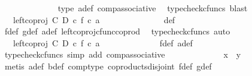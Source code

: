 \begin{isabellebody}
\ \ \ \ \ \ \ \ \ \ \ \ \isamarkupfalse%
\ {\isasymphi}{\isacharunderscore}{\kern0pt}type\ a{\isacharprime}{\kern0pt}{\isacharunderscore}{\kern0pt}def\ comp{\isacharunderscore}{\kern0pt}associative{}\ \isamarkupfalse%
\ {\isacharparenleft}{\kern0pt}typecheck{\isacharunderscore}{\kern0pt}cfuncs{\isacharcomma}{\kern0pt}\ blast{\isacharparenright}{\kern0pt}\isanewline
\ \ \ \ \ \ \ \ \ \ \isamarkupfalse%
\ \isamarkupfalse%
\ {\isachardoublequoteopen}{\isachardot}{\kern0pt}{\isachardot}{\kern0pt}{\isachardot}{\kern0pt}\ {\isacharequal}{\kern0pt}\ {\isacharparenleft}{\kern0pt}left{\isacharunderscore}{\kern0pt}coproj\ C\ D\ {\isasymcirc}\isactrlsub c\ f{\isacharparenright}{\kern0pt}\ {\isasymcirc}\isactrlsub c\ a{\isacharprime}{\kern0pt}\ {\isachardoublequoteclose}\isanewline
\ \ \ \ \ \ \ \ \ \ \ \ \isamarkupfalse%
\ {\isasymphi}{\isacharunderscore}{\kern0pt}def\ \isamarkupfalse%
\ f{\isacharunderscore}{\kern0pt}def\ g{\isacharunderscore}{\kern0pt}def\ a{\isacharprime}{\kern0pt}{\isacharunderscore}{\kern0pt}def\ left{\isacharunderscore}{\kern0pt}coproj{\isacharunderscore}{\kern0pt}cfunc{\isacharunderscore}{\kern0pt}coprod\ \isamarkupfalse%
\ {\isacharparenleft}{\kern0pt}typecheck{\isacharunderscore}{\kern0pt}cfuncs{\isacharcomma}{\kern0pt}\ auto{\isacharparenright}{\kern0pt}\isanewline
\ \ \ \ \ \ \ \ \ \ \isamarkupfalse%
\ \isamarkupfalse%
\ {\isachardoublequoteopen}{\isachardot}{\kern0pt}{\isachardot}{\kern0pt}{\isachardot}{\kern0pt}\ {\isacharequal}{\kern0pt}\ left{\isacharunderscore}{\kern0pt}coproj\ C\ D\ {\isasymcirc}\isactrlsub c\ {\isacharparenleft}{\kern0pt}f\ {\isasymcirc}\isactrlsub c\ a{\isacharprime}{\kern0pt}{\isacharparenright}{\kern0pt}{\isachardoublequoteclose}\isanewline
\ \ \ \ \ \ \ \ \ \ \ \ \isamarkupfalse%
\ f{\isacharunderscore}{\kern0pt}def\ a{\isacharprime}{\kern0pt}{\isacharunderscore}{\kern0pt}def\ \isamarkupfalse%
\ {\isacharparenleft}{\kern0pt}typecheck{\isacharunderscore}{\kern0pt}cfuncs{\isacharcomma}{\kern0pt}\ simp\ add{\isacharcolon}{\kern0pt}\ comp{\isacharunderscore}{\kern0pt}associative{}{\isacharparenright}{\kern0pt}\isanewline
\ \ \ \ \ \ \ \ \ \ \isamarkupfalse%
\ \isamarkupfalse%
\ {\isachardoublequoteopen}x\ {\isacharequal}{\kern0pt}\ y{\isachardoublequoteclose}\isanewline
\ \ \ \ \ \ \ \ \ \ \ \ \isamarkupfalse%
\ {\isacharparenleft}{\kern0pt}metis\ a{\isacharprime}{\kern0pt}{\isacharunderscore}{\kern0pt}def{\isacharparenleft}{\kern0pt}{}{\isacharparenright}{\kern0pt}\ b{\isacharunderscore}{\kern0pt}def\ comp{\isacharunderscore}{\kern0pt}type\ coproducts{\isacharunderscore}{\kern0pt}disjoint\ f{\isacharunderscore}{\kern0pt}def{\isacharparenleft}{\kern0pt}{}{\isacharparenright}{\kern0pt}\ g{\isacharunderscore}{\kern0pt}def{\isacharparenleft}{\kern0pt}{}{\isacharparenright}{\kern0pt}{\isacharparenright}{\kern0pt}\isanewline

\end{isabellebody}
